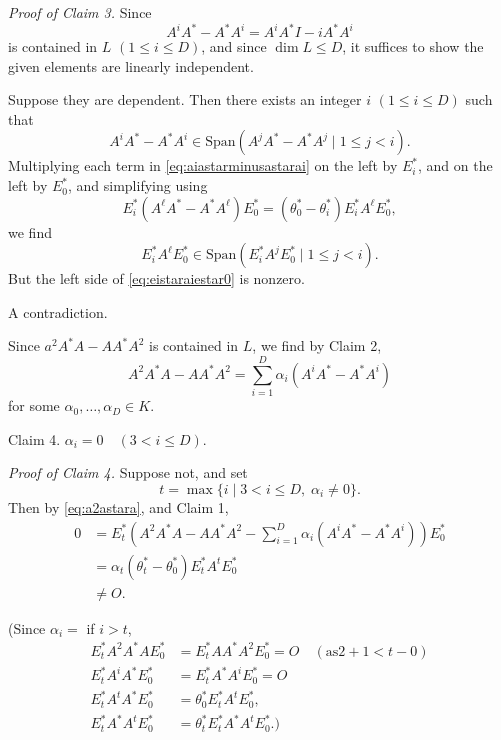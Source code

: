 \documentclass[
]{book}
\theoremstyle{definition}
\theoremstyle{definition}
\theoremstyle{definition}
\theoremstyle{definition}
\theoremstyle{remark}
\begin{document}
\emph{Proof of Claim 3.}
Since
\[A^iA^*-A^*A^i = A^iA^*I - iA^*A^i\]
is contained in \(L\) \((1\leq i\leq D)\), and since \(\dim L \leq D\), it suffices to show the given elements are linearly independent.

Suppose they are dependent. Then there exists an integer \(i\) \((1\leq i\leq D)\) such that
\begin{equation}
A^iA^*-A^*A^i \in \mathrm{Span}(A^jA^*-A^*A^j\mid 1\leq j < i). \label{eq:aiastarminusastarai}
\end{equation}
Multiplying each term in \eqref{eq:aiastarminusastarai} on the left by \(E^*_i\), and on the left by \(E^*_0\), and simplifying using
\[E^*_i(A^\ell A^*-A^*A^\ell)E^*_0 = (\theta^*_0-\theta^*_i)E^*_iA^\ell E^*_0,\]
we find
\begin{equation}
E^*_iA^\ell E^*_0 \in \mathrm{Span}(E^*_iA^jE^*_0\mid 1\leq j < i). \label{eq:eistaraiestar0}
\end{equation}
But the left side of \eqref{eq:eistaraiestar0} is nonzero.

A contradiction.

Since \(a^2A^*A-AA^*A^2\) is contained in \(L\), we find by Claim 2,
\begin{equation}
A^2A^*A - AA^*A^2 = \sum_{i=1}^D\alpha_i(A^iA^*-A^*A^i) \label{eq:a2astara}
\end{equation}
for some \(\alpha_0, \ldots, \alpha_D\in K\).

Claim 4. \(\alpha_i = 0 \quad (3<i\leq D)\).

\emph{Proof of Claim 4.}
Suppose not, and set
\[t = \max\{i\mid 3<i\leq D, \; \alpha_i\neq 0\}.\]
Then by \eqref{eq:a2astara}, and Claim 1,
\begin{align}
0 & = E^*_t\left(A^2A^*A - AA^*A^2 - \sum_{i=1}^D\alpha_i(A^iA^*-A^*A^i)\right)E^*_0\\
& = \alpha_t(\theta^*_t-\theta^*_0)E^*_tA^tE^*_0\\
& \neq O.
\end{align}

(Since \(\alpha_i=\) if \(i>t\),
\begin{align}
E^*_tA^2A^*AE^*_0 & = E^*_tAA^*A^2E^*_0 = O \quad (\text{as} 2+1 < t-0)\\
E^*_tA^iA^*E^*_0 & = E^*_tA^*A^iE^*_0 = O\\
E^*_tA^tA^*E^*_0 & = \theta^*_0 E^*_tA^tE^*_0,\\
E^*_tA^*A^tE^*_0 & = \theta^*_tE^*_tA^*A^tE^*_0.)\\
\end{align}
\end{document}
